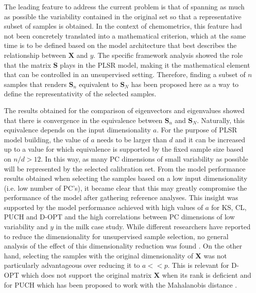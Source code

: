 \documentclass[journal=ancham,manuscript=article]{achemso}
\begin{document}
The leading feature to address the current problem is that of spanning as much as possible the variability contained in the original set so that a representative subset of samples is obtained. In the context of chemometrics, this feature had not been concretely translated into a mathematical criterion, which at the same time is to be defined based on the model architecture that best describes the relationship between $\mathbf{X}$ and $y$. The specific framework analysis showed the role that the matrix $\mathbf{S}$ plays in the PLSR model, making it the mathematical element that can be controlled in an unsupervised setting. Therefore, finding a subset of $n$ samples that renders $\mathbf{S}_n$ equivalent to $\mathbf{S}_N$ has been proposed here as a way to define the representativity of the selected samples. 

The results obtained for the comparison of eigenvectors and eigenvalues showed that there is convergence in the equivalence between $\mathbf{S}_n$ and $\mathbf{S}_N$. Naturally, this equivalence depends on the input dimensionality $a$. For the purpose of PLSR model building, the value of $a$ needs to be larger than $d$ and it can be increased up to a value for which equivalence is supported by the fixed sample size based on $n/d>12$. In this way, as many PC dimensions of small variability as possible will be represented by the selected calibration set. From the model performance results obtained when selecting the samples based on a low input dimensionality (i.e. low number of PC's), it became clear that this may greatly compromise the performance of the model after gathering reference analyses. This insight was supported by the model performance achieved with high values of $a$ for KS, CL, PUCH and D-OPT and the high correlations between PC dimensions of low variability and $y$ in the milk case study. While different researchers have reported to reduce the dimensionality for unsupervised sample selection, no general analysis of the effect of this dimensionality reduction was found \cite{Naes1990, Brandmaier2012, Nawar2018, Au2020}. On the other hand, selecting the samples with the original dimensionality of $\mathbf{X}$ was not particularly advantageous over reducing it to $a<<p$. This is relevant for D-OPT which does not support the original matrix $\mathbf{X}$ when its rank is deficient and for PUCH which has been proposed to work with the Mahalanobis distance \cite{Puchwein1988}.
\end{document}
